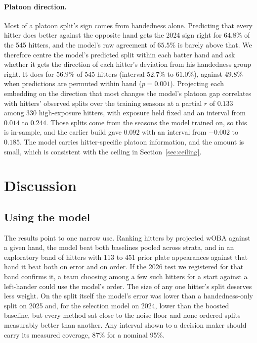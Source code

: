 \documentclass[11pt,letterpaper]{article}
\begin{document}
\paragraph{Platoon direction.} Most of a platoon split's sign comes from handedness alone. Predicting that every hitter does better against the opposite hand gets the 2024 sign right for $64.8\%$ of the 545 hitters, and the model's raw agreement of $65.5\%$ is barely above that. We therefore centre the model's predicted split within each batter hand and ask whether it gets the direction of each hitter's deviation from his handedness group right. It does for $56.9\%$ of 545 hitters (interval $52.7\%$ to $61.0\%$), against $49.8\%$ when predictions are permuted within hand ($p = 0.001$). Projecting each embedding on the direction that most changes the model's platoon gap correlates with hitters' observed splits over the training seasons at a partial $r$ of $0.133$ among 330 high-exposure hitters, with exposure held fixed and an interval from $0.014$ to $0.244$. Those splits come from the seasons the model trained on, so this is in-sample, and the earlier build gave $0.092$ with an interval from $-0.002$ to $0.185$. The model carries hitter-specific platoon information, and the amount is small, which is consistent with the ceiling in Section~\ref{sec:ceiling}.

\section{Discussion}
\label{sec:discussion}

\subsection{Using the model}
\label{sec:use}

The results point to one narrow use. Ranking hitters by projected wOBA against a given hand, the model beat both baselines pooled across strata, and in an exploratory band of hitters with 113 to 451 prior plate appearances against that hand it beat both on error and on order. If the 2026 test we registered for that band confirms it, a team choosing among a few such hitters for a start against a left-hander could use the model's order. The size of any one hitter's split deserves less weight. On the split itself the model's error was lower than a handedness-only split on 2025 and, for the selection model on 2024, lower than the boosted baseline, but every method sat close to the noise floor and none ordered splits measurably better than another. Any interval shown to a decision maker should carry its measured coverage, 87\% for a nominal 95\%.
\end{document}
